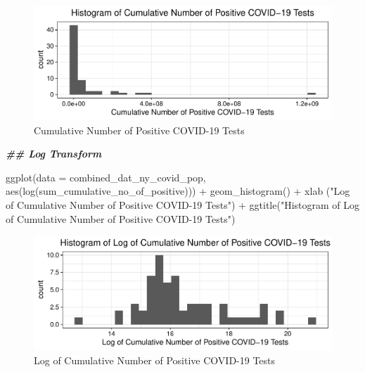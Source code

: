 \documentclass[
  12pt,
]{article}
\newenvironment{Shaded}{\begin{snugshade}}{\end{snugshade}}
\newcommand{\AttributeTok}[1]{\textcolor[rgb]{0.77,0.63,0.00}{#1}}
\newcommand{\DocumentationTok}[1]{\textcolor[rgb]{0.56,0.35,0.01}{\textbf{\textit{#1}}}}
\newcommand{\FunctionTok}[1]{\textcolor[rgb]{0.00,0.00,0.00}{#1}}
\newcommand{\NormalTok}[1]{#1}
\newcommand{\SpecialCharTok}[1]{\textcolor[rgb]{0.00,0.00,0.00}{#1}}
\newcommand{\StringTok}[1]{\textcolor[rgb]{0.31,0.60,0.02}{#1}}
\begin{document}
\begin{figure}

{\centering \includegraphics{EDA_Final_Group_Project_files/figure-latex/unnamed-chunk-4-1} 

}

\caption{Cumulative Number of Positive COVID-19 Tests}\label{fig:unnamed-chunk-4}
\end{figure}

\begin{Shaded}
\begin{Highlighting}[]
\DocumentationTok{\#\# Log Transform}

\FunctionTok{ggplot}\NormalTok{(}\AttributeTok{data =}\NormalTok{ combined\_dat\_ny\_covid\_pop,}
       \FunctionTok{aes}\NormalTok{(}\FunctionTok{log}\NormalTok{(sum\_cumulative\_no\_of\_positive))) }\SpecialCharTok{+}
  \FunctionTok{geom\_histogram}\NormalTok{() }\SpecialCharTok{+}
  \FunctionTok{xlab}\NormalTok{ (}\StringTok{"Log of Cumulative Number of Positive COVID{-}19 Tests"}\NormalTok{) }\SpecialCharTok{+}
  \FunctionTok{ggtitle}\NormalTok{(}\StringTok{"Histogram of Log of Cumulative Number of Positive COVID{-}19 Tests"}\NormalTok{)}
\end{Highlighting}
\end{Shaded}

\begin{figure}

{\centering \includegraphics{EDA_Final_Group_Project_files/figure-latex/unnamed-chunk-5-1} 

}

\caption{Log of Cumulative Number of Positive COVID-19 Tests}\label{fig:unnamed-chunk-5}
\end{figure}
\end{document}
